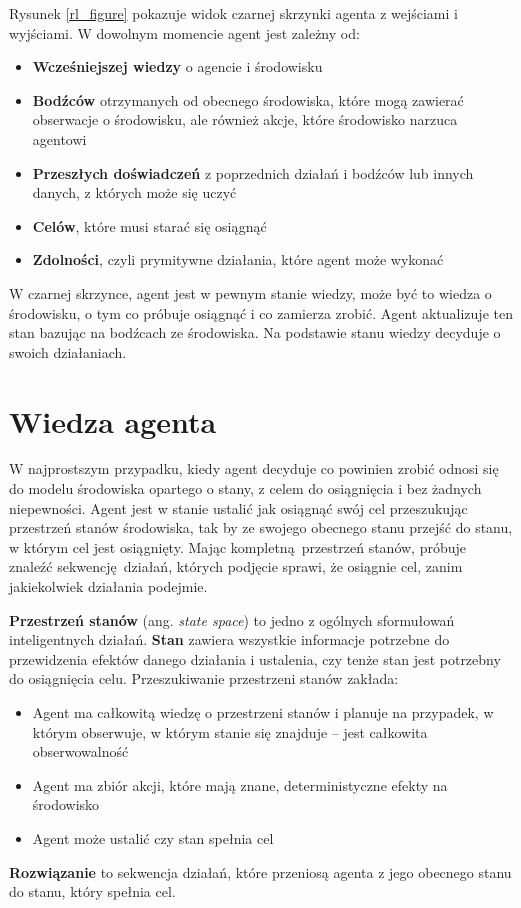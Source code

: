 \documentclass[a4paper,12pt,oneside]{book}
\begin{document}
Rysunek \ref{rl_figure} pokazuje widok czarnej skrzynki agenta z wejściami
i wyjściami. W dowolnym momencie agent jest zależny od:
\begin{itemize}
	\setlength\itemsep{-0.4em}
	\item \textbf{Wcześniejszej wiedzy} o agencie i środowisku
	\item \textbf{Bodźców} otrzymanych od obecnego
		środowiska, które mogą zawierać obserwacje o
		środowisku, ale również akcje, które środowisko
		narzuca agentowi
	\item \textbf{Przeszłych doświadczeń} z poprzednich
		działań i bodźców lub innych danych, z których
		może się uczyć
	\item \textbf{Celów}, które musi starać się osiągnąć
	\item \textbf{Zdolności}, czyli prymitywne działania, które agent
		może wykonać
\end{itemize}
W czarnej skrzynce, agent jest w pewnym stanie wiedzy, może być to wiedza o
środowisku, o tym co próbuje osiągnąć i co zamierza zrobić. Agent aktualizuje
ten stan bazując na bodźcach ze środowiska. Na podstawie stanu wiedzy decyduje
o swoich działaniach\cite{ai_foundations_agents_situated}.

\section{Wiedza agenta}
W najprostszym przypadku, kiedy agent decyduje co powinien zrobić odnosi się
do modelu środowiska opartego o stany, z celem do osiągnięcia i bez żadnych
niepewności. Agent jest w stanie ustalić jak osiągnąć swój cel przeszukując
przestrzeń stanów środowiska, tak by ze swojego obecnego stanu przejść do
stanu, w którym cel jest osiągnięty. Mając kompletną przestrzeń stanów, próbuje
znaleźć sekwencję działań, których podjęcie sprawi, że osiągnie cel, zanim
jakiekolwiek działania podejmie.

\textbf{Przestrzeń stanów} (ang. \textit{state space}) to jedno z ogólnych
sformułowań inteligentnych działań. \textbf{Stan} zawiera wszystkie informacje
potrzebne do przewidzenia efektów danego działania i ustalenia, czy tenże stan
jest potrzebny do osiągnięcia celu. Przeszukiwanie przestrzeni stanów zakłada:
\begin{itemize}
	\setlength\itemsep{-0.4em}
\item Agent ma całkowitą wiedzę o przestrzeni stanów i planuje na przypadek,
	w którym obserwuje, w którym stanie się znajduje -- jest całkowita
	obserwowalność
\item Agent ma zbiór akcji, które mają znane, deterministyczne efekty na
	środowisko
\item Agent może ustalić czy stan spełnia cel
\end{itemize}
\textbf{Rozwiązanie} to sekwencja działań, które przeniosą agenta z jego
obecnego stanu do stanu, który spełnia cel.
\end{document}

